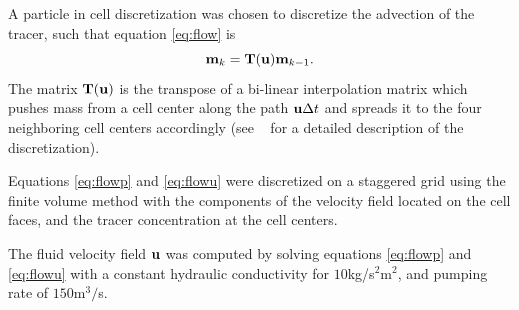 \documentclass[leqno,onefignum,onetabnum]{siamltexmm}
\newcommand{\bfT}	{{\bf{T}}}
\newcommand{\bfm}	{{\bf{m}}}
\newcommand{\bfu}	{{\bf{u}}}
\begin{document}
A particle in cell discretization \cite{Edwards2012} was chosen to discretize the advection of the tracer, such that equation \eqref{eq:flow} is
\begin{equation*}
\bfm _k= \bfT(\bfu)\bfm_{k-1}. 
\end{equation*}
The matrix $\bfT(\bfu)$ is the transpose of a bi-linear interpolation matrix which pushes mass from a cell center along the  path $\bfu \Delta t$ and spreads it to the four neighboring cell centers accordingly (see ~\cite{Fohring2014} for
a detailed description of the discretization). 

Equations \eqref{eq:flowp} and \eqref{eq:flowu}  were discretized on a staggered grid using the finite volume method with the components of the velocity field located on the cell faces, and the tracer concentration at the cell centers. 

%
%       
%      
%      
%

The  fluid velocity field $\bfu$ was  computed by solving equations \eqref{eq:flowp} and \eqref{eq:flowu} with a constant hydraulic conductivity for  $10$kg/s$^2$m$^2$, and pumping rate of $150$m$^3/$s. 
\end{document}
